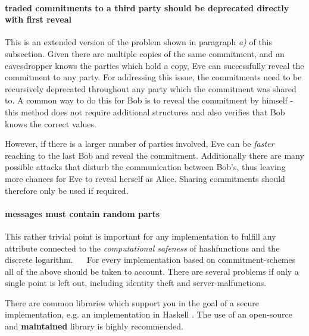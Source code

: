 	\paragraph{traded commitments to a third party should be deprecated directly with first reveal} This is an extended version of the problem shown in paragraph \textit{a)} of this subsection. Given there are multiple copies of the same commitment, and an eavesdropper knows the parties which hold a copy, Eve can successfully reveal the commitment to any party. For addressing this issue, the commitments need to be recursively deprecated throughout any party which the commitment was shared to. A common way to do this for Bob is to reveal the commitment by himself - this method does not require additional structures and also verifies that Bob knows the correct values. 
	
	However, if there is a larger number of parties involved, Eve can be \textit{faster} reaching to the last Bob and reveal the commitment. Additionally there are many possible attacks that disturb the communication between Bob's, thus leaving more chances for Eve to reveal herself as Alice. Sharing commitments should therefore only be used if required. 
	\paragraph{messages must contain random parts} This rather trivial point is important for any implementation to fulfill any attribute connected to the \textit{computational safeness} of hashfunctions and the discrete logarithm.  
~\newline ~\newline
For every implementation based on commitment-schemes all of the above should be taken to account. There are several problems if only a single point is left out, including identity theft and server-malfunctions. 

There are common libraries which support you in the goal of a secure implementation, e.g. an implementation in Haskell \cite{b0} . The use of an open-source and \textbf{maintained} library is highly recommended.